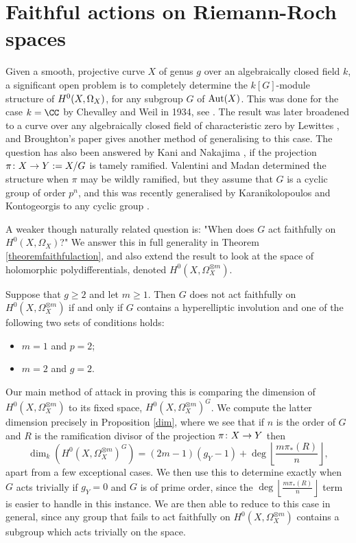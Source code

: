  \section{Faithful actions on Riemann-Roch spaces}

Given a smooth, projective curve $X$ of genus $g$ over an algebraically closed field $k$, a significant open problem is to completely determine the $k[G]$-module structure of ${H^0(X,\Omega_X)}$, for any subgroup $G$ of $\operatorname{Aut}(X)$.
This was done for the case $k = \CC$ by Chevalley and Weil in 1934, see \cite{chev}.
The result was later broadened to a curve over any algebraically closed field of characteristic zero by Lewittes \cite{lewittes}, and Broughton's paper \cite{broughton} gives another method of generalising to this case.
The question has also been answered by Kani \cite{Kani} and Nakajima \cite{naka2}, if the projection $\pi \colon X \rightarrow Y:= X/G$ is tamely ramified.
Valentini and Madan \cite{valmadan} determined the structure when $\pi$ may be wildly ramified, but they assume that $G$ is a cyclic group of order $p^n$, and this was recently generalised by Karanikolopoulos and Kontogeorgis to any cyclic group \cite{kako}.

A weaker though naturally related question is: "When does $G$ act faithfully on $H^0(X,\Omega_X)$?"
We answer this in full generality in Theorem \ref{theoremfaithfulaction}, and also extend the result to look at the space of holomorphic polydifferentials, denoted $H^0(X,\Omega_X^{\otimes m})$.
    \begin{unnumthm}
    Suppose that $g\geq 2$ and let $m\geq1$. 
    Then $G$ does not act faithfully on $H^0(X,\Omega_X^{\otimes m})$ if and only if $G$ contains a hyperelliptic involution and one of the following two sets of conditions holds:
    \vspace{-1em}
    \begin{itemize}
        \item $m=1$ and $p=2$;
        \item $m=2$ and $g=2$.
        \end{itemize}
    \end{unnumthm}

Our main method of attack in proving this is comparing the dimension of $H^0(X,\Omega_X^{\otimes m})$ to its fixed space, $H^0(X,\Omega_X^{\otimes m})^G$.
We compute the latter dimension precisely in Proposition \ref{dim}, where we see that if $n$ is the order of $G$ and $R$ is the ramification divisor of the projection $\pi \colon X \rightarrow Y$ then 
    \[
    \dim_k \left( H^0(X,\Omega_X^{\otimes m})^G \right) = (2m-1)(g_Y-1) + \deg\left\lfloor\frac{m\pi_*(R)}{n} \right\rfloor,
    \]
apart from a few exceptional cases.
We then use this to determine exactly when $G$ acts trivially if $g_Y = 0$ and $G$ is of prime order, since the $\deg\left\lfloor\frac{m\pi_*(R)}{n} \right\rfloor$ term is easier to handle in this instance.
We are then able to reduce to this case in general, since any group that fails to act faithfully on $H^0(X,\Omega_X^{\otimes m})$ contains a subgroup which acts trivially on the space.


